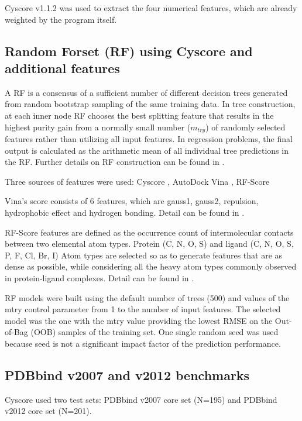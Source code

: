 \documentclass[journal=jacsat,manuscript=article]{achemso}
\begin{document}
Cyscore v1.1.2 was used to extract the four numerical features, which are already weighted by the program itself.

\subsection{Random Forset (RF) using Cyscore and additional features}

A RF \cite{1309} is a consensus of a sufficient number of different decision trees generated from random bootstrap sampling of the same training data. In tree construction, at each inner node RF chooses the best splitting feature that results in the highest purity gain from a normally small number ($m_{try}$) of randomly selected features rather than utilizing all input features. In regression problems, the final output is calculated as the arithmetic mean of all individual tree predictions in the RF. Further details on RF construction can be found in \cite{564,1362}.

Three sources of features were used: Cyscore \cite{1372}, AutoDock Vina \cite{595}, RF-Score \cite{564}

Vina's score consists of 6 features, which are gauss1, gauss2, repulsion, hydrophobic effect and hydrogen bonding. Detail can be found in \cite{595,1362}.

RF-Score features are defined as the occurrence count of intermolecular contacts between two elemental atom types. Protein (C, N, O, S) and ligand (C, N, O, S, P, F, Cl, Br, I) Atom types are selected so as to generate features that are as dense as possible, while considering all the heavy atom types commonly observed in protein-ligand complexes. Detail can be found in \cite{564,1362}.

RF models were built using the default number of trees (500) and values of the mtry control parameter from 1 to the number of input features. The selected model was the one with the mtry value providing the lowest RMSE on the Out-of-Bag (OOB) samples of the training set. One single random seed was used because seed is not a significant impact factor of the prediction performance.

\subsection{PDBbind v2007 and v2012 benchmarks}

Cyscore used two test sets: PDBbind v2007 core set (N=195) and PDBbind v2012 core set (N=201).
\end{document}
